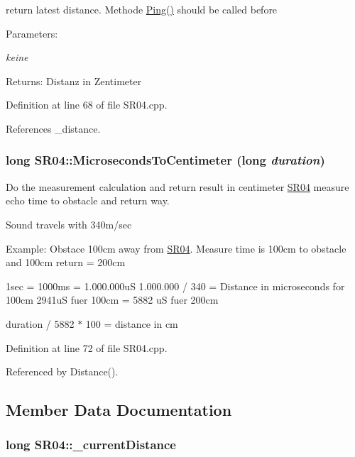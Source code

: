 return latest distance. Methode \hyperlink{class_s_r04_1a76036315b7f13e475988b6ada09ab6}{Ping()} should be called before \begin{Desc}
\item[Parameters:]
\begin{description}
\item[{\em keine}]\end{description}
\end{Desc}
\begin{Desc}
\item[Returns:]Distanz in Zentimeter \end{Desc}


Definition at line 68 of file SR04.cpp.

References \_\-distance.\hypertarget{class_s_r04_50c7ecb90dd637067812f1df57fb0211}{
\subsubsection[MicrosecondsToCentimeter]{\setlength{\rightskip}{0pt plus 5cm}long SR04::MicrosecondsToCentimeter (long {\em duration})}}
\label{class_s_r04_50c7ecb90dd637067812f1df57fb0211}


Do the measurement calculation and return result in centimeter \hyperlink{class_s_r04}{SR04} measure echo time to obstacle and return way. \par
 Sound travels with 340m/sec \par
 Example: Obstace 100cm away from \hyperlink{class_s_r04}{SR04}. Measure time is 100cm to obstacle and 100cm return = 200cm \par
 1sec = 1000ms = 1.000.000uS 1.000.000 / 340 = Distance in microseconds for 100cm 2941uS fuer 100cm = 5882 uS fuer 200cm

duration / 5882 $\ast$ 100 = distance in cm 

Definition at line 72 of file SR04.cpp.

Referenced by Distance().

\subsection{Member Data Documentation}
\hypertarget{class_s_r04_7c1be2e3886d6062108f6ce6914f4713}{
\subsubsection[\_\-currentDistance]{\setlength{\rightskip}{0pt plus 5cm}long {\bf SR04::\_\-currentDistance}}}
\label{class_s_r04_7c1be2e3886d6062108f6ce6914f4713}




